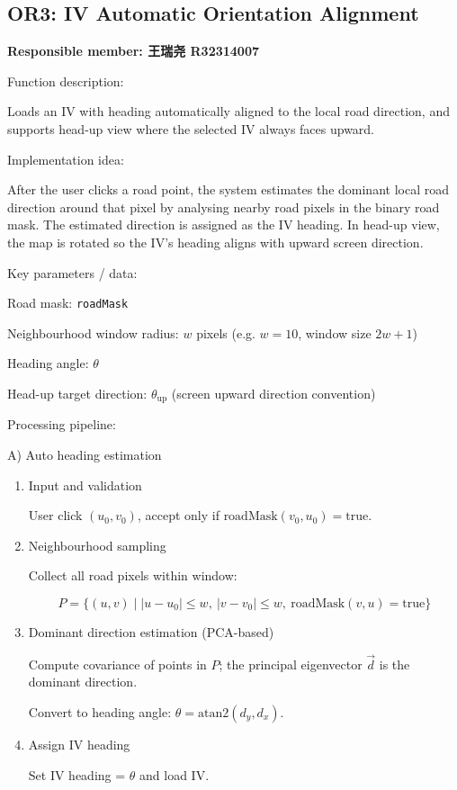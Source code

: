 \documentclass[12pt,a4paper]{ctexart}
\begin{document}
\subsection{OR3: IV Automatic Orientation Alignment}
\label{sec:or3}

\textbf{Responsible member: 王瑞尧 R32314007}

Function description:

Loads an IV with heading automatically aligned to the local road direction, and supports head-up view where the selected IV always faces upward.

Implementation idea:

After the user clicks a road point, the system estimates the dominant local road direction around that pixel by analysing nearby road pixels in the binary road mask. The estimated direction is assigned as the IV heading. In head-up view, the map is rotated so the IV’s heading aligns with upward screen direction.

Key parameters / data:

Road mask: \texttt{roadMask}

Neighbourhood window radius: $w$ pixels (e.g. $w = 10$, window size $2w + 1$)

Heading angle: $\theta$

Head-up target direction: $\theta_\text{up}$ (screen upward direction convention)

Processing pipeline:

A) Auto heading estimation

\begin{enumerate}
  \item Input and validation

  User click $(u_0, v_0)$, accept only if $\text{roadMask}(v_0, u_0)=\text{true}$.

  \item Neighbourhood sampling

  Collect all road pixels within window:

  \[
  P=\{(u,v)\mid |u-u_0|\le w,\ |v-v_0|\le w,\ \text{roadMask}(v,u)=\text{true}\}
  \]

  \item Dominant direction estimation (PCA-based)

  Compute covariance of points in $P$; the principal eigenvector $\vec{d}$ is the dominant direction.

  Convert to heading angle: $\theta = \text{atan2}(d_y, d_x)$.

  \item Assign IV heading

  Set IV heading = $\theta$ and load IV.
\end{enumerate}
\end{document}
